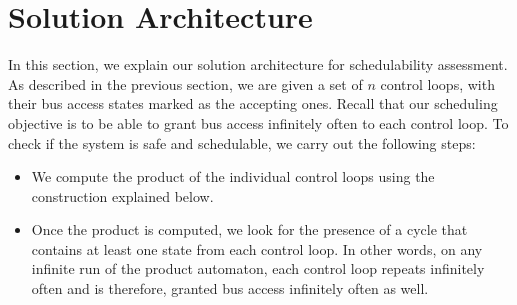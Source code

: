 \section{Solution Architecture} \label{sec4}
\noindent
In this section, we explain our solution architecture for schedulability assessment. As described in the previous section, we are given a set of $n$ control loops, with their bus access states marked as the accepting ones. Recall that our scheduling objective is to be able to grant bus access infinitely often to each control loop. To check if the system is safe and schedulable, we carry out the following steps: 

\begin{itemize}

\item We compute the product of the individual control loops using the construction explained below. 

\item Once the product is computed, we look for the presence of a cycle that contains at least one state from each control loop. In other words, on any infinite run of the product automaton, each control loop repeats infinitely often and is therefore, granted bus access infinitely often as well. 

\end{itemize}

